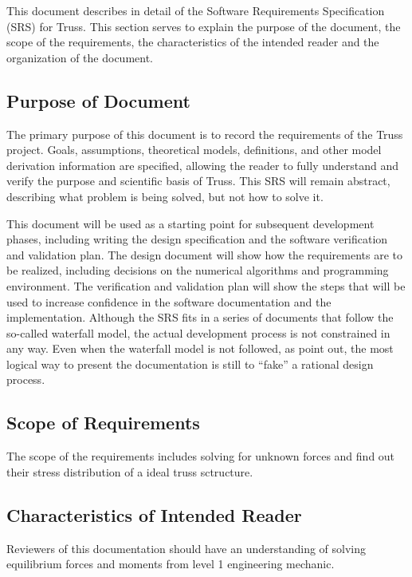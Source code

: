 \documentclass[12pt]{article}
\begin{document}
This document describes in detail of the Software Requirements Specification 
(SRS) for Truss. This section serves to explain the purpose of the document, 
the scope of the requirements, the characteristics of the intended reader and 
the organization of the document.

\subsection{Purpose of Document}

The primary purpose of this document is to record the requirements of the Truss 
project. Goals, assumptions, theoretical models, definitions, and other model 
derivation information are specified, allowing the reader to fully understand 
and verify the purpose and scientific basis of Truss. This SRS will remain 
abstract, describing what problem is being solved, but not how to solve 
it.

This document will be used as a starting point for subsequent development 
phases, including writing the design specification and the software 
verification and validation plan. The design document will show how the 
requirements are to be realized, including decisions on the numerical 
algorithms and programming environment. The verification and validation plan 
will show the steps that will be used to increase confidence in the software 
documentation and the implementation. Although the SRS fits in a series of 
documents that follow the so-called waterfall model, the actual development 
process is not constrained in any way. Even when the waterfall model is not 
followed, as \cite{ParnasandClements} point out, the most logical way to 
present the documentation is still to “fake” a rational design process.

\subsection{Scope of Requirements} 
The scope of the requirements includes solving for unknown forces and find out 
their stress distribution of a ideal truss sctructure.

\subsection{Characteristics of Intended Reader} \label{sec_IntendedReader}
Reviewers of this documentation should have an understanding of solving 
equilibrium forces and moments from level 1 engineering mechanic.
\end{document}

